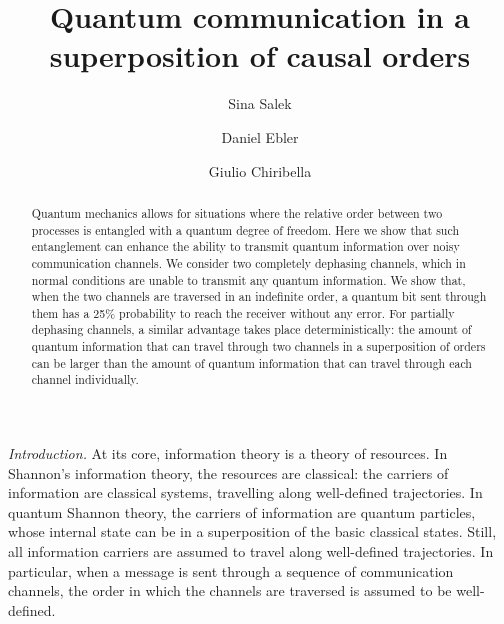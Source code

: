 \documentclass[aps,prl,twocolumn,superscriptaddress,groupedaddress]{revtex4}
\begin{document}
\title{
Quantum communication in a superposition of  causal orders}
 
\author{Sina Salek}
\author{Daniel Ebler}
\author{Giulio Chiribella}

\begin{abstract}
Quantum mechanics allows for situations where the relative order between two  processes is entangled with a quantum degree of freedom. Here we show that  such entanglement can enhance the ability  to transmit quantum information over noisy communication channels.    We consider two completely dephasing  channels, which in normal conditions are unable to transmit any quantum information. We show that, when the two channels are traversed in an indefinite order, a quantum bit sent through them  has a 25\% probability to reach the receiver without any error.   For partially dephasing channels,  a similar advantage takes place deterministically: the amount of quantum information that can  travel through two channels in a superposition of orders  can be larger than the amount of quantum information that can travel through each channel individually.   
\end{abstract}

\maketitle



{\em Introduction.} At its core, information theory is a theory of resources.  In Shannon's information theory, the resources are classical: the carriers of information are classical systems, travelling along well-defined trajectories.     In quantum Shannon theory, the carriers of information are quantum particles, whose internal state can be in a superposition of the basic classical states.   Still, all information carriers are assumed to travel along well-defined trajectories. In particular, when a message is sent through a sequence of communication channels, the order in which the channels are traversed is  assumed to be well-defined. 
\end{document}
